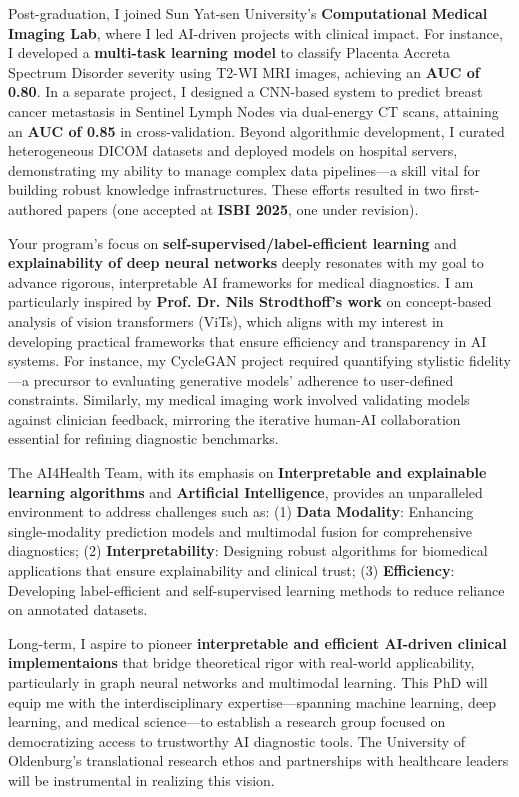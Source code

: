\documentclass[11pt,a4paper, final]{moderncv}
\begin{document}
Post-graduation, I joined Sun Yat-sen University's \textbf{Computational Medical Imaging Lab}, 
where I led AI-driven projects with clinical impact. 
For instance, I developed a \textbf{multi-task learning model} to 
classify Placenta Accreta Spectrum Disorder severity using T2-WI MRI images, achieving an \textbf{AUC of 0.80}. 
In a separate project, 
I designed a CNN-based system to predict breast cancer metastasis in Sentinel Lymph Nodes via dual-energy CT scans, 
attaining an \textbf{AUC of 0.85} in cross-validation. 
Beyond algorithmic development, I curated heterogeneous DICOM datasets and deployed models on hospital servers, 
demonstrating my ability to manage complex data pipelines—a skill vital for building robust knowledge infrastructures. 
These efforts resulted in two first-authored papers (one accepted at \textbf{ISBI 2025}, one under revision).

Your program's focus on \textbf{self-supervised/label-efficient learning} and \textbf{explainability of deep neural networks} 
deeply resonates with my goal to advance rigorous, interpretable AI frameworks for medical diagnostics. 
I am particularly inspired by \textbf{Prof. Dr. Nils Strodthoff's work} 
on concept-based analysis of vision transformers (ViTs), 
which aligns with my interest in developing practical frameworks that ensure efficiency and transparency in AI systems. 
For instance, my CycleGAN project required quantifying stylistic fidelity—a precursor to evaluating generative models' adherence to user-defined constraints. 
Similarly, my medical imaging work involved validating models against clinician feedback, mirroring the iterative human-AI collaboration essential for refining diagnostic benchmarks.

The AI4Health Team, with its emphasis on \textbf{Interpretable and explainable learning algorithms} 
and \textbf{Artificial Intelligence}, 
provides an unparalleled environment to address challenges such as: 
(1) \textbf{Data Modality}: Enhancing single-modality prediction models and multimodal fusion for comprehensive diagnostics; 
(2) \textbf{Interpretability}: Designing robust algorithms for biomedical applications that ensure explainability and clinical trust; 
(3) \textbf{Efficiency}: Developing label-efficient and self-supervised learning methods to reduce reliance on annotated datasets.

Long-term, I aspire to pioneer \textbf{interpretable and efficient AI-driven clinical implementaions} 
that bridge theoretical rigor with real-world applicability, particularly in graph neural networks and multimodal learning. 
This PhD will equip me with the interdisciplinary expertise—spanning machine learning, deep learning, and medical science—to establish a research group focused on democratizing access to trustworthy AI diagnostic tools. 
The University of Oldenburg's translational research ethos and partnerships with healthcare leaders will be instrumental in realizing this vision.
\end{document}
